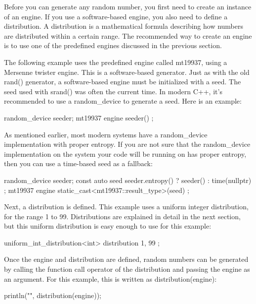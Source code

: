 Before you can generate any random number, you first need to create an instance of an engine. If you use a software-based engine, you also need to define a distribution. A distribution is a mathematical formula describing how numbers are distributed within a certain range. The recommended way to create an engine is to use one of the predefined engines discussed in the previous section.

The following example uses the predefined engine called mt19937, using a Mersenne twister engine. This is a software-based generator. Just as with the old rand() generator, a software-based engine must be initialized with a seed. The seed used with srand() was often the current time. In modern C++, it’s recommended to use a random\_device to generate a seed. Here is an example:

\begin{cpp}
random_device seeder;
mt19937 engine { seeder() };
\end{cpp}

As mentioned earlier, most modern systems have a random\_device implementation with proper entropy. If you are not sure that the random\_device implementation on the system your code will be running on has proper entropy, then you can use a time-based seed as a fallback:

\begin{cpp}
random_device seeder;
const auto seed { seeder.entropy() ? seeder() : time(nullptr) };
mt19937 engine { static_cast<mt19937::result_type>(seed) };
\end{cpp}

Next, a distribution is defined. This example uses a uniform integer distribution, for the range 1 to 99. Distributions are explained in detail in the next section, but this uniform distribution is easy enough to use for this example:

\begin{cpp}
uniform_int_distribution<int> distribution { 1, 99 };
\end{cpp}

Once the engine and distribution are defined, random numbers can be generated by calling the function call operator of the distribution and passing the engine as an argument. For this example, this is written as distribution(engine):

\begin{cpp}
println("{}", distribution(engine));
\end{cpp}

